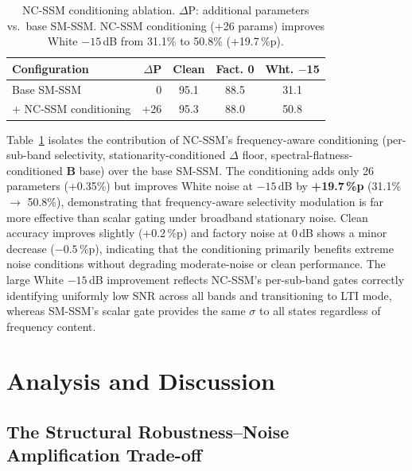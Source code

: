 \documentclass[journal]{IEEEtran}
\begin{document}
\begin{table}[t]
\centering
\caption{NC-SSM conditioning ablation. $\Delta$P: additional parameters vs.\ base SM-SSM. NC-SSM conditioning (+26 params) improves White $-15$\,dB from 31.1\% to 50.8\% (+19.7\,\%p).}
\label{tab:ablation}
\small
\setlength{\tabcolsep}{3pt}
\begin{tabular}{lrccc}
\toprule
\textbf{Configuration} & \textbf{$\Delta$P} & \textbf{Clean} & \textbf{Fact. 0} & \textbf{Wht. $-$15} \\
\midrule
Base SM-SSM     & 0   & 95.1 & 88.5 & 31.1 \\
\quad + NC-SSM conditioning      & +26 & 95.3 & 88.0 & 50.8 \\
\bottomrule
\end{tabular}
\end{table}

Table~\ref{tab:ablation} isolates the contribution of NC-SSM's frequency-aware conditioning (per-sub-band selectivity, stationarity-conditioned $\Delta$ floor, spectral-flatness-conditioned $\mathbf{B}$ base) over the base SM-SSM.
The conditioning adds only 26 parameters (+0.35\%) but improves White noise at $-15$\,dB by \textbf{+19.7\,\%p} (31.1\% $\to$ 50.8\%), demonstrating that frequency-aware selectivity modulation is far more effective than scalar gating under broadband stationary noise.
Clean accuracy improves slightly (+0.2\,\%p) and factory noise at 0\,dB shows a minor decrease ($-0.5$\,\%p), indicating that the conditioning primarily benefits extreme noise conditions without degrading moderate-noise or clean performance.
The large White $-15$\,dB improvement reflects NC-SSM's per-sub-band gates correctly identifying uniformly low SNR across all bands and transitioning to LTI mode, whereas SM-SSM's scalar gate provides the same $\sigma$ to all states regardless of frequency content.


\section{Analysis and Discussion}
\label{sec:discussion}

\subsection{The Structural Robustness--Noise Amplification Trade-off}
\end{document}
